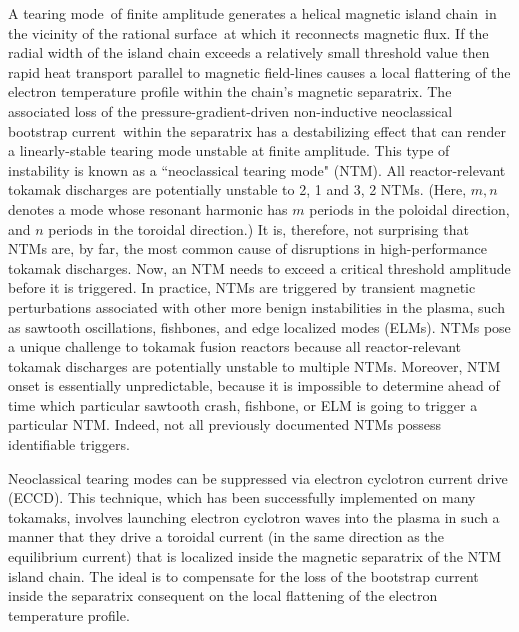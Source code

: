 \documentclass[12pt,prb,aps]{revtex4-1}
\begin{document}
A tearing mode\,\cite{tear1} of finite amplitude generates a helical magnetic island chain\,\cite{ntm1} in the vicinity of the rational surface\,\cite{ideal3} at which it reconnects magnetic flux.
If the radial width of the island chain exceeds a relatively small threshold value then rapid  heat transport parallel to magnetic field-lines causes a local flattering of the  electron temperature profile
 within the chain's magnetic separatrix.\cite{ntm2} The associated loss of the pressure-gradient-driven non-inductive neoclassical bootstrap current\,\cite{ntm3} within the separatrix
has a destabilizing effect that can render a linearly-stable tearing mode unstable at finite amplitude. This type of instability is known as a ``neoclassical tearing mode"  (NTM).  All reactor-relevant tokamak
discharges are potentially unstable  to 2, 1 and 3, 2 NTMs.\cite{ntm4,ntm5}  (Here, $m, n$ denotes a mode whose resonant harmonic has $m$ periods in the poloidal
direction, and $n$ periods in the toroidal direction.) It is, therefore, not  surprising that NTMs are, by far, the most common cause of disruptions in high-performance  tokamak
discharges.\cite{iter,ntm4,ntm5,vries}
Now, an NTM needs to exceed a critical  threshold amplitude
before it is triggered. In practice, NTMs are
triggered by transient magnetic perturbations associated with other more benign instabilities in the plasma, such as sawtooth oscillations, fishbones, and
edge localized modes (ELMs).\cite{ntm4,ntm5,sawtooth,elm} NTMs pose a unique challenge to tokamak fusion reactors  because  all reactor-relevant tokamak discharges
are potentially unstable to multiple NTMs. Moreover, NTM onset is essentially unpredictable, because it
is impossible to determine ahead of time which particular sawtooth crash, fishbone, or ELM is going to trigger a particular NTM.\cite{nstx} Indeed, not all previously documented NTMs possess identifiable
triggers.\cite{ntm6} 

Neoclassical tearing  modes can be suppressed via electron cyclotron current drive (ECCD).\cite{prater} This technique, which has been
successfully implemented on many tokamaks,\cite{eccd1,eccd2,eccd3,eccd4,eccd5} involves
launching electron cyclotron waves into the plasma in such a manner that they drive a toroidal current (in the same direction as the equilibrium current) that is 
localized  inside the magnetic separatrix of
the NTM island chain. The ideal is to compensate for the loss of the bootstrap current inside the separatrix consequent on the local flattening
of the electron temperature profile.\cite{ntm4,ntm5} 
\end{document}

